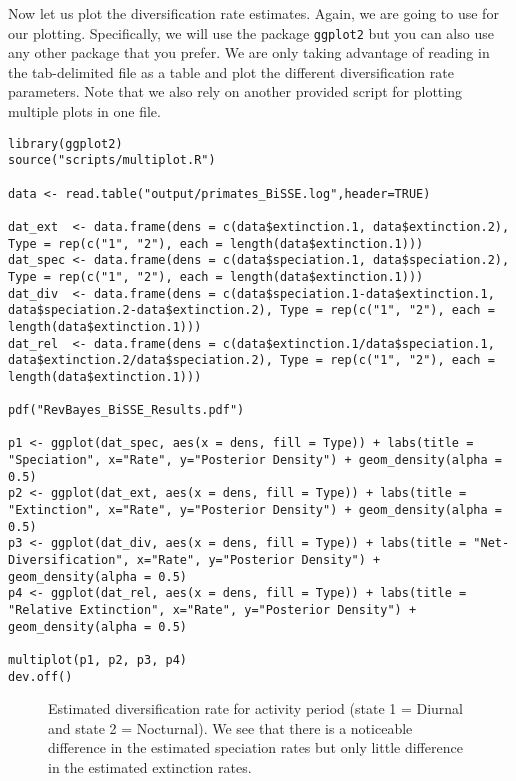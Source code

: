 Now let us plot the diversification rate estimates.
Again, we are going to use \R for our plotting.
Specifically, we will use the package \texttt{ggplot2} but you can also use any other package that you prefer.
We are only taking advantage of reading in the tab-delimited file as a table and plot the different diversification rate parameters.
Note that we also rely on another provided \R script for plotting multiple plots in one file.
{\tt \begin{snugshade*}
\begin{lstlisting}
library(ggplot2)
source("scripts/multiplot.R")

data <- read.table("output/primates_BiSSE.log",header=TRUE)

dat_ext  <- data.frame(dens = c(data$extinction.1, data$extinction.2), Type = rep(c("1", "2"), each = length(data$extinction.1)))
dat_spec <- data.frame(dens = c(data$speciation.1, data$speciation.2), Type = rep(c("1", "2"), each = length(data$extinction.1)))
dat_div  <- data.frame(dens = c(data$speciation.1-data$extinction.1, data$speciation.2-data$extinction.2), Type = rep(c("1", "2"), each = length(data$extinction.1)))
dat_rel  <- data.frame(dens = c(data$extinction.1/data$speciation.1, data$extinction.2/data$speciation.2), Type = rep(c("1", "2"), each = length(data$extinction.1)))

pdf("RevBayes_BiSSE_Results.pdf")

p1 <- ggplot(dat_spec, aes(x = dens, fill = Type)) + labs(title = "Speciation", x="Rate", y="Posterior Density") + geom_density(alpha = 0.5)
p2 <- ggplot(dat_ext, aes(x = dens, fill = Type)) + labs(title = "Extinction", x="Rate", y="Posterior Density") + geom_density(alpha = 0.5)
p3 <- ggplot(dat_div, aes(x = dens, fill = Type)) + labs(title = "Net-Diversification", x="Rate", y="Posterior Density") + geom_density(alpha = 0.5)
p4 <- ggplot(dat_rel, aes(x = dens, fill = Type)) + labs(title = "Relative Extinction", x="Rate", y="Posterior Density") + geom_density(alpha = 0.5)

multiplot(p1, p2, p3, p4)
dev.off()
\end{lstlisting}
\end{snugshade*}}
\begin{figure}[h!]
\centering
{}
\caption{\small Estimated diversification rate for activity period (state 1 = Diurnal and state 2 = Nocturnal). We see that there is a noticeable difference in the estimated speciation rates but only little difference in the estimated extinction rates.}
\label{fig:div_rates_BiSSE}
\end{figure}


